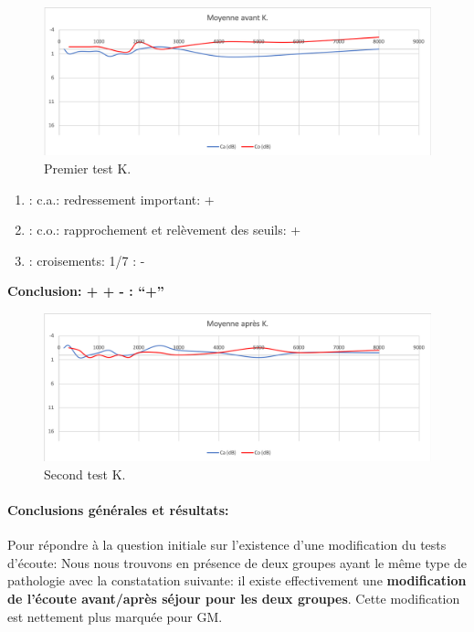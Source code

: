         \begin{figure}
\centering
\includegraphics[width=0.7\linewidth]{images/graphiques/kad_pre.png}
\caption[Moyenne OG+OD]{Premier test K.}
       
\label{groupecontroleimage1}
\end{figure}
	\begin{enumerate}
 		
 		\item : c.a.: redressement important: +
                
 		\item : c.o.: rapprochement et relèvement des seuils: +
 		\item : croisements: 1/7 :  -
                  
                \end{enumerate}

                \textbf{  Conclusion:  + + -       : ``+''}

                 \begin{figure}
\centering
\includegraphics[width=0.7\linewidth]{images/graphiques/kad_post.png}
\caption[Moyenne OG+OD]{Second test K.}
       
\label{groupecontroleimage1}
\end{figure}
          
\paragraph{ Conclusions générales et résultats:}

             Pour répondre à la question initiale sur l'existence d'une modification du tests d'écoute: Nous nous trouvons
           en présence de deux groupes ayant le même type de
           pathologie avec la constatation suivante: il existe effectivement
          une \textbf{modification de l'écoute avant/après séjour pour les
          deux groupes}.
          Cette modification est nettement plus marquée
          pour GM.
         
